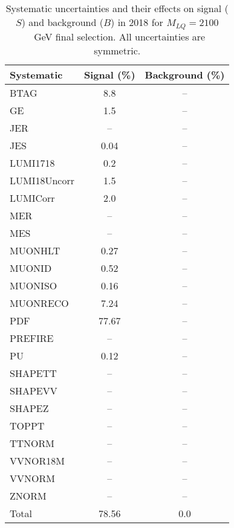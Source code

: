 \begin{table}[htbp]
\begin{center}
\caption{Systematic uncertainties and their effects on signal ($S$) and background ($B$) in 2018 for $M_{LQ}=2100$~GeV final selection. All uncertainties are symmetric.}
\begin{tabular}{lcc}
\hline\hline
Systematic & Signal (\%) & Background (\%) \\ \hline 
BTAG & 8.8 & --\\ 
GE & 1.5 & --\\ 
JER & -- & --\\ 
JES & 0.04 & --\\ 
LUMI1718 & 0.2 & --\\ 
LUMI18Uncorr & 1.5 & --\\ 
LUMICorr & 2.0 & --\\ 
MER & -- & --\\ 
MES & -- & --\\ 
MUONHLT & 0.27 & --\\ 
MUONID & 0.52 & --\\ 
MUONISO & 0.16 & --\\ 
MUONRECO & 7.24 & --\\ 
PDF & 77.67 & --\\ 
PREFIRE & -- & --\\ 
PU & 0.12 & --\\ 
SHAPETT & -- & --\\ 
SHAPEVV & -- & --\\ 
SHAPEZ & -- & --\\ 
TOPPT & -- & --\\ 
TTNORM & -- & --\\ 
VVNOR18M & -- & --\\ 
VVNORM & -- & --\\ 
ZNORM & -- & --\\ 
Total & 78.56 & 0.0\\ \hline \hline
\end{tabular}
\label{tab:SysUncertainties_uujj_2100}
\end{center}
\end{table}

